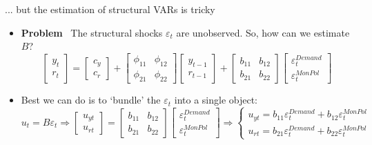 \documentclass[10pt,handout]{beamer}
\begin{document}
\begin{frame}
{... but the estimation of structural VARs is tricky}
\begin{itemize}
\item \textbf{Problem} \ The structural shocks $\varepsilon_{t}$ are unobserved. So, how can we estimate $B$?
\begin{equation*}
\begin{bmatrix}
y_{t} \\
r_{t}%
\end{bmatrix}%
=%
\begin{bmatrix}
c_{y} \\
c_{r}%
\end{bmatrix}%
+%
\begin{bmatrix}
\phi _{11} & \phi _{12} \\
\phi _{21} & \phi _{22}%
\end{bmatrix}%
\begin{bmatrix}
y_{t-1} \\
r_{t-1}%
\end{bmatrix}%
+%
\begin{bmatrix}
b_{11} & b_{12} \\
b_{21} & b_{22}%
\end{bmatrix}%
\begin{bmatrix}
\varepsilon_{t}^{Demand} \\
\varepsilon_{t}^{MonPol}%
\end{bmatrix}%
\end{equation*}%
\pause

\item Best we can do is to `bundle' the $\varepsilon_{t}$ into a single
object: 
\begin{equation*}
u_{t}=B\varepsilon_{t}\Rightarrow 
\begin{bmatrix}
u_{yt} \\ 
u_{rt}
\end{bmatrix}%
=
\left[ 
\begin{array}{cc}
b_{11} & b_{12} \\ 
b_{21} & b_{22}%
\end{array}%
\right] 
\begin{bmatrix}
\varepsilon_{t}^{Demand} \\ 
\varepsilon_{t}^{MonPol}%
\end{bmatrix}%
\Rightarrow \left\{ 
\begin{array}{c}
u_{yt}=b_{11}\varepsilon_{t}^{Demand}+b_{12}\varepsilon_{t}^{MonPol} \\ 
u_{rt}=b_{21}\varepsilon_{t}^{Demand}+b_{22}\varepsilon_{t}^{MonPol}%
\end{array}%
\right.
\end{equation*}
\pause


\end{itemize}
\end{frame}
\end{document}
